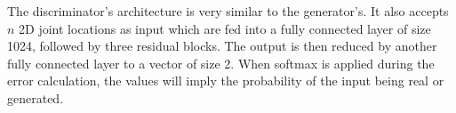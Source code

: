 
The discriminator's architecture is very similar to the generator's. 
It also accepts $n$ 2D joint locations as input which are fed into a fully connected layer of size 1024, followed by three residual blocks.
The output is then reduced by another fully connected layer to a vector of size 2.
When softmax is applied during the error calculation, the values will imply the probability of the input being real or generated.